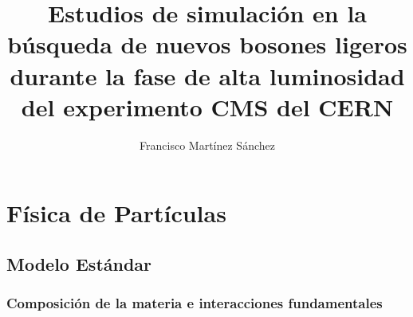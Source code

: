 \documentclass[12pt]{report}
\begin{document}
\title{Estudios de simulación en la búsqueda de nuevos bosones ligeros durante la fase de alta luminosidad del experimento CMS del CERN}
\author{Francisco Martínez Sánchez}
\maketitle
\begin{acknowledgements}

\end{acknowledgements}

\tableofcontents
\clearpage
\listoftables
\clearpage
\listoffigures
\clearpage

\begin{abstract}
\end{abstract}









\chapter{Física de Partículas}


	
	\section{Modelo Estándar} 	
	
	
		\subsection{Composición de la materia e interacciones fundamentales} 
		
		
\end{document}
